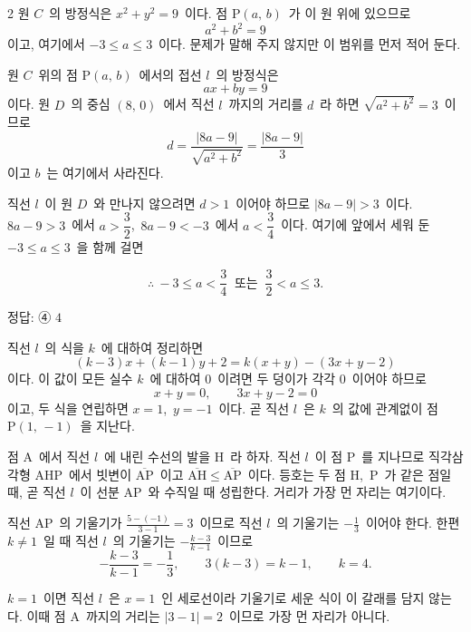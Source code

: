 \documentclass[10pt,fleqn]{article}
\begin{document}
\begin{multicols*}{2}
원 $C$\ 의 방정식은 $x^{2}+y^{2}=9$\ 이다. 점 $\mathrm{P}(a,\,b)$\ 가 이 원 위에 있으므로
$$a^{2}+b^{2}=9$$
이고, 여기에서 $-3\le a\le 3$\ 이다. 문제가 말해 주지 않지만 이 범위를 먼저 적어 둔다.

원 $C$\ 위의 점 $\mathrm{P}(a,\,b)$\ 에서의 접선 $l$\ 의 방정식은
$$ax+by=9$$
이다. 원 $D$\ 의 중심 $(8,\,0)$\ 에서 직선 $l$\ 까지의 거리를 $d$\ 라 하면 $\sqrt{a^{2}+b^{2}}=3$\ 이므로
$$d=\dfrac{|8a-9|}{\sqrt{a^{2}+b^{2}}}=\dfrac{|8a-9|}{3}$$
이고 $b$\ 는 여기에서 사라진다.

직선 $l$\ 이 원 $D$\ 와 만나지 않으려면 $d>1$\ 이어야 하므로 $|8a-9|>3$\ 이다. $8a-9>3$\ 에서 $a>\dfrac32$,\ $8a-9<-3$\ 에서 $a<\dfrac34$\ 이다. 여기에 앞에서 세워 둔 $-3\le a\le 3$\ 을 함께 걸면

$$\therefore\ -3\le a<\dfrac34\ \text{ 또는 }\ \dfrac32<a\le 3.$$


\begin{dmanswerbox}
정답: ④ $4$
\end{dmanswerbox}

직선 $l$\ 의 식을 $k$\ 에 대하여 정리하면
$$(k-3)x+(k-1)y+2=k(x+y)-(3x+y-2)$$
이다. 이 값이 모든 실수 $k$\ 에 대하여 $0$\ 이려면 두 덩이가 각각 $0$\ 이어야 하므로
$$x+y=0,\qquad 3x+y-2=0$$
이고, 두 식을 연립하면 $x=1$,\ $y=-1$\ 이다. 곧 직선 $l$\ 은 $k$\ 의 값에 관계없이 점 $\mathrm{P}(1,\,-1)$\ 을 지난다.

점 $\mathrm{A}$\ 에서 직선 $l$\ 에 내린 수선의 발을 $\mathrm{H}$\ 라 하자. 직선 $l$\ 이 점 $\mathrm{P}$\ 를 지나므로 직각삼각형 $\mathrm{AHP}$\ 에서 빗변이 $\overline{\mathrm{AP}}$\ 이고 $\overline{\mathrm{AH}}\le\overline{\mathrm{AP}}$\ 이다. 등호는 두 점 $\mathrm{H}$,\ $\mathrm{P}$\ 가 같은 점일 때, 곧 직선 $l$\ 이 선분 $\mathrm{AP}$\ 와 수직일 때 성립한다. 거리가 가장 먼 자리는 여기이다.

직선 $\mathrm{AP}$\ 의 기울기가 $\frac{5-(-1)}{3-1}=3$\ 이므로 직선 $l$\ 의 기울기는 $-\frac13$\ 이어야 한다. 한편 $k\ne 1$\ 일 때 직선 $l$\ 의 기울기는 $-\frac{k-3}{k-1}$\ 이므로
$$-\dfrac{k-3}{k-1}=-\dfrac13,\qquad 3(k-3)=k-1,\qquad k=4.$$

$k=1$\ 이면 직선 $l$\ 은 $x=1$\ 인 세로선이라 기울기로 세운 식이 이 갈래를 담지 않는다. 이때 점 $\mathrm{A}$\ 까지의 거리는 $|3-1|=2$\ 이므로 가장 먼 자리가 아니다.


\end{multicols*}
\end{document}
